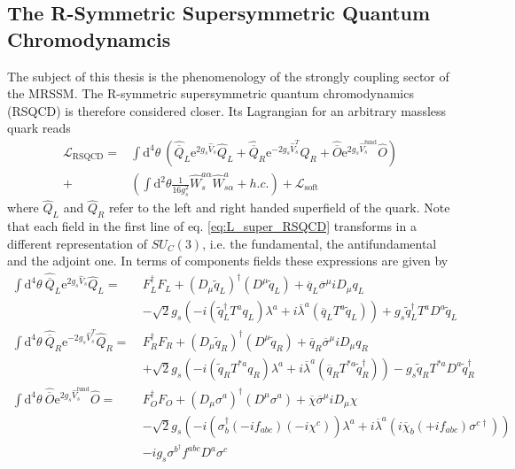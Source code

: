\subsection{The R-Symmetric Supersymmetric Quantum Chromodynamcis}
The subject of this thesis is the phenomenology of the strongly coupling sector of the MRSSM. The R-symmetric supersymmetric quantum chromodynamics (RSQCD) is therefore considered closer. Its Lagrangian for an arbitrary massless quark reads
\begin{align}
\mathcal{L}_{\mathrm{RSQCD}} = &\int\mathrm{d}^4\theta\ \left( \hat{\overline{Q}}_L \mathrm{e}^{2g_s\hat{V}_s} \hat{Q}_L + \hat{\overline{Q}}_R \mathrm{e}^{-2g_s\hat{V}^T_s} \hat{Q}_R + \hat{\overline{O}} \mathrm{e}^{2g_s\hat{V}^{\mathrm{fund}}_s} \hat{O}\right)\nonumber\\
+& \left( \int \mathrm{d}^2\theta \frac{1}{16g_s^2} \hat{W}_s^{a\alpha}\hat{W}^a_{s\alpha} + h.c. \right) + \mathcal{L}_{\mathrm{soft}}\label{eq:L_super_RSQCD}
\end{align}
where $\hat{Q}_L$ and $\hat{Q}_R$ refer to the left and right handed superfield of the quark. Note that each field in the first line of eq. \ref{eq:L_super_RSQCD} transforms in a different representation of $SU_C(3)$, i.e. the fundamental, the antifundamental and the adjoint one. In terms of components fields these expressions are given by
\begin{align}
\int\mathrm{d}^4\theta\ \hat{\overline{Q}}_L \mathrm{e}^{2g_s\hat{V}_s} \hat{Q}_L =\ & F_L^\dagger F_L + (D_\mu \tilde{q}_L)^\dagger (D^\mu \tilde{q}_L) + \overline{q}_L \overline{\sigma}^\mu i D_\mu q_L\nonumber\\
&-\sqrt{2}g_s \left( -i (\tilde{q}_L^\dagger T^a q_L ) \lambda^a + i \overline{\lambda}^a (\overline{q}_L T^a \tilde{q}_L) \right) + g_s\tilde{q}_L^\dagger T^a D^a \tilde{q}_L\label{eq:RSQCD_Feynmanrules1}\\
\int\mathrm{d}^4\theta\ \hat{\overline{Q}}_R \mathrm{e}^{-2g_s\hat{V}^T_s} \hat{Q}_R =\  & F_R^\dagger F_R + (D_\mu \tilde{q}_R)^\dagger (D^\mu \tilde{q}_R) + \overline{q}_R \overline{\sigma}^\mu i D_\mu q_R\nonumber\\
&+\sqrt{2}g_s \left( -i (\tilde{q}_R T^{\ast a} q_R ) \lambda^a + i \overline{\lambda}^a (\overline{q}_R T^{\ast a} \tilde{q}_R^\dagger) \right) - g_s \tilde{q}_R T^{\ast a} D^a \tilde{q}_R^\dagger\label{eq:RSQCD_Feynmanrules2}\\
\int\mathrm{d}^4\theta\ \hat{\overline{O}} \mathrm{e}^{2g_s\hat{V}^{\mathrm{fund}}_s} \hat{O} =\  & F_O^\dagger F_O + (D_\mu \sigma^a)^\dagger (D^\mu \sigma^a) + \overline{\chi} \overline{\sigma}^\mu i D_\mu \chi\nonumber\\
&-\sqrt{2}g_s \left( -i (\sigma_b^\dagger (-if_{abc}) (-i\chi^c) ) \lambda^a + i \overline{\lambda}^a (i\overline{\chi}_b (+if_{abc}) \sigma^{c\dagger}) \right)\nonumber\\
&-ig_s\sigma^{b^\dagger} f^{abc}D^a\sigma^c
\end{align}
